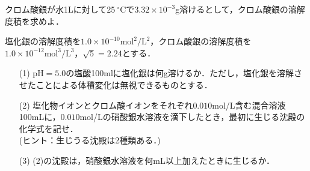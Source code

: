\documentclass[a4paper,11pt]{ltjsarticle}
\begin{document}
\begin{toi}\noindent 
クロム酸銀が水1Lに対して25$~^\circ$Cで$3.32\times 10^{-3}$g溶けるとして，クロム酸銀の溶解度積を求めよ．
\end{toi}

\begin{toi}
\noindent 塩化銀の溶解度積を$1.0\times 10^{-10}\text{mol}^2/\text{L}^2$，クロム酸銀の溶解度積を$1.0\times 10^{-12}\text{mol}^3/\text{L}^3$，$\sqrt5=2.24$とする．
\begin{itemize}
    \item [(1)] pH$=5.0$の塩酸100mlに塩化銀は何g溶けるか．ただし，塩化銀を溶解させたことによる体積変化は無視できるものとする．
    \item [(2)]塩化物イオンとクロム酸イオンをそれぞれ$0.010$mol/L含む混合溶液100mLに，$0.010$mol/Lの硝酸銀水溶液を滴下したとき，最初に生じる沈殿の化学式を記せ．\\(ヒント：生じうる沈殿は2種類ある．)
    \item [(3)](2)の沈殿は，硝酸銀水溶液を何mL以上加えたときに生じるか．
\end{itemize}
\end{toi}
\end{document}
